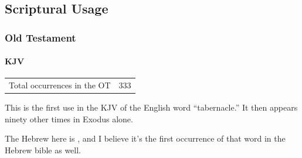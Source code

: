 
\subsection{Scriptural Usage} %
	\label{TABERNACLE-SCRIPTURES}
	

	\subsubsection{Old Testament} %
		\label{TABERNACLE-OT}
	
		\paragraph{KJV}
			\label{TABERNACLE-OT-KJV}
	
			\begin{tabular}{ll}
				Total occurrences in the OT & 333
			\end{tabular}
			
			\begin{compactdesc}
				\item[{\hyperref[EXODUS-25-9]{Exodus 25:9}}]
					\begin{compactenum}
						\item This is the first use in the KJV of the English word ``tabernacle.'' It then appears ninety other times in Exodus alone.
						\item The Hebrew here is , and I believe it's the first occurrence of that word in the Hebrew bible as well.
					\end{compactenum}
			\end{compactdesc}
			
		
